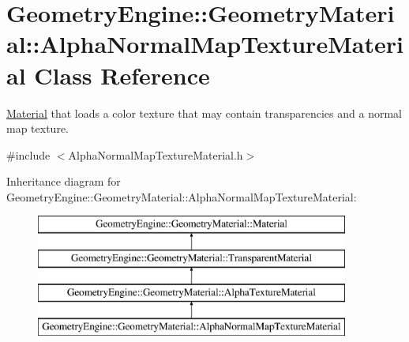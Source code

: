 \hypertarget{class_geometry_engine_1_1_geometry_material_1_1_alpha_normal_map_texture_material}{}\section{Geometry\+Engine\+::Geometry\+Material\+::Alpha\+Normal\+Map\+Texture\+Material Class Reference}
\label{class_geometry_engine_1_1_geometry_material_1_1_alpha_normal_map_texture_material}


\mbox{\hyperlink{class_geometry_engine_1_1_geometry_material_1_1_material}{Material}} that loads a color texture that may contain transparencies and a normal map texture.  




{\ttfamily \#include $<$Alpha\+Normal\+Map\+Texture\+Material.\+h$>$}

Inheritance diagram for Geometry\+Engine\+::Geometry\+Material\+::Alpha\+Normal\+Map\+Texture\+Material\+:\begin{figure}[H]
\begin{center}
\leavevmode
\includegraphics[height=4.000000cm]{class_geometry_engine_1_1_geometry_material_1_1_alpha_normal_map_texture_material}
\end{center}
\end{figure}

